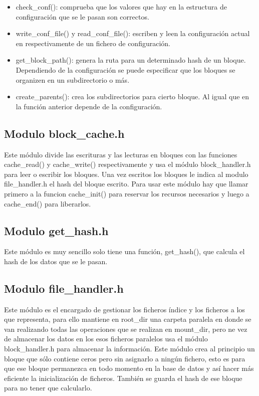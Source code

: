 \documentclass[a4paper,12pt]{article}
\begin{document}
\begin{itemize}
\item check\_conf(): comprueba que los valores que hay en la estructura de configuración que se le pasan son correctos.

\item write\_conf\_file() y read\_conf\_file(): escriben y leen la configuración actual en respectivamente de un fichero de configuración.

\item get\_block\_path(): genera la ruta para un determinado hash de un bloque. Dependiendo de la configuración se puede especificar que los bloques se organizen en un subdirectorio o más.

\item create\_parents(): crea los subdirectorios para cierto bloque. Al igual que en la función anterior depende de la configuración.
\end{itemize}

\subsection{Modulo block\_cache.h}

Este módulo divide las escrituras y las lecturas en bloques con las funciones cache\_read() y cache\_write() respectivamente y usa el módulo block\_handler.h para leer o escribir los bloques. Una vez escritos los bloques le indica al modulo file\_handler.h el hash del bloque escrito. Para usar este módulo hay que llamar primero a la funcion cache\_init() para reservar los recursos necesarios y luego a cache\_end() para liberarlos.

\subsection{Modulo get\_hash.h}

Este módulo es muy sencillo solo tiene una función, get\_hash(), que calcula el hash de los datos que se le pasan.

\subsection{Modulo file\_handler.h}

Este módulo es el encargado de gestionar los ficheros índice y los ficheros a los que representa, para ello mantiene en root\_dir una carpeta paralela en donde se van realizando todas las operaciones que se realizan en mount\_dir, pero ne vez de almacenar los datos en los esos ficheros paralelos usa el módulo block\_handler.h para almacenar la información. Este módulo crea al principio un bloque que sólo contiene ceros pero sin asignarlo a ningún fichero, esto es para que ese bloque permanezca en todo momento en la base de datos y así hacer más eficiente la inicialización de ficheros. También se guarda el hash de ese bloque para no tener que calcularlo.
\bigskip
\end{document}
